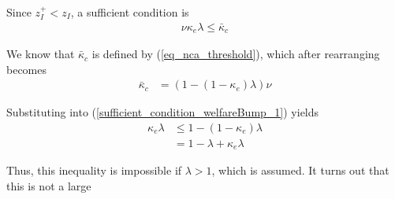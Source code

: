 \documentclass[12pt,english]{article}
\theoremstyle{remark}
\begin{document}
Since $z_I^+ < z_I$, a sufficient condition is
\begin{align}
	\nu \kappa_e \lambda \le \bar{\kappa}_c  \label{sufficient_condition_welfareBump_1}
\end{align}

We know that $\bar{\kappa}_c$ is defined by (\ref{eq_nca_threshold}), which after rearranging becomes 
\begin{align*}
	\bar{\kappa}_c &= (1 - (1-\kappa_e)\lambda) \nu 
\end{align*}

Substituting into (\ref{sufficient_condition_welfareBump_1}) yields
\begin{align}
	\kappa_e \lambda &\le 1 - (1-\kappa_e) \lambda \\
	                 &= 1 - \lambda + \kappa_e \lambda 
\end{align}

Thus, this inequality is impossible if $\lambda > 1$, which is assumed. It turns out that this is not a large 








\end{document}
